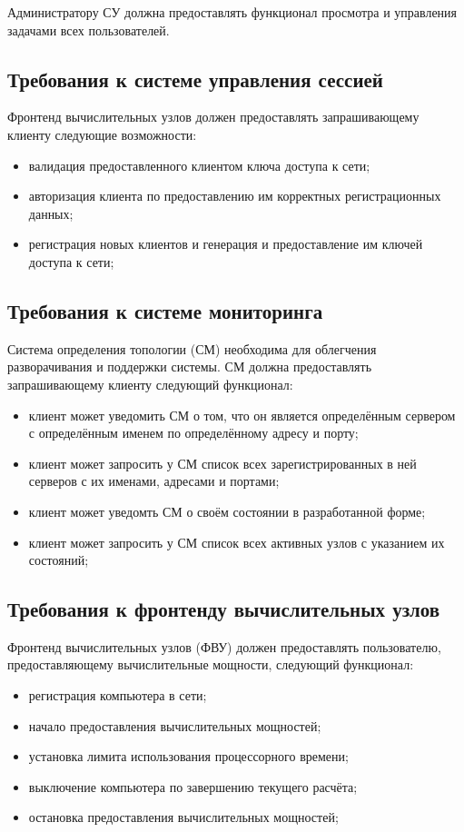 \documentclass[a4paper,12pt]{report}
\numberwithin{equation}{section}
\begin{document}
Администратору СУ должна предоставлять функционал просмотра и управления задачами всех пользователей.

\subsection{Требования к системе управления сессией}
Фронтенд вычислительных узлов должен предоставлять запрашивающему клиенту следующие возможности:
\begin{itemize}
    \item валидация предоставленного клиентом ключа доступа к сети;
    \item авторизация клиента по предоставлению им корректных регистрационных данных;
    \item регистрация новых клиентов и генерация и предоставление им ключей доступа к сети;
\end{itemize}

\subsection{Требования к системе мониторинга}
Система определения топологии (СМ) необходима для облегчения разворачивания и поддержки системы.
СМ должна предоставлять запрашивающему клиенту следующий функционал:
\begin{itemize}
  \item клиент может уведомить СМ о том, что он является определённым сервером с определённым именем по определённому адресу и порту;
  \item клиент может запросить у СМ список всех зарегистрированных в ней серверов с их именами, адресами и портами;
  \item клиент может уведомть СМ о своём состоянии в разработанной форме;
  \item клиент может запросить у СМ список всех активных узлов с указанием их состояний;
\end{itemize}

\subsection{Требования к фронтенду вычислительных узлов}
Фронтенд вычислительных узлов (ФВУ) должен предоставлять пользователю, предоставляющему вычислительные мощности, следующий функционал:
\begin{itemize}
    \item регистрация компьютера в сети;
    \item начало предоставления вычислительных мощностей;
    \item установка лимита использования процессорного времени;
    \item выключение компьютера по завершению текущего расчёта;
    \item остановка предоставления вычислительных мощностей;
\end{itemize}
\end{document}
